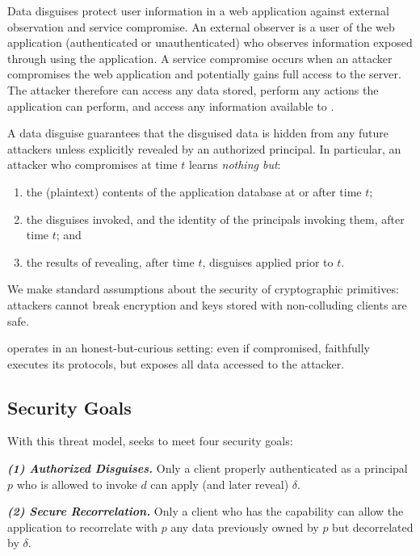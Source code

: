 %
Data disguises protect user information in a web application against external observation
and service compromise.
%
An external observer is a user of the web application (authenticated or unauthenticated) who
observes information exposed through using the application.
%
A service compromise occurs when an attacker compromises the web application and potentially
gains full access to the server.
%
The attacker therefore can access any data stored, perform any actions the application can
perform, and access any information available to \sys.
%

%
A data disguise guarantees that the disguised data is hidden from any future attackers unless
explicitly revealed by an authorized principal.
%
In particular, an attacker who compromises \sys at time $t$ learns \emph{nothing but}:
\begin{enumerate}[nosep]
  \item the (plaintext) contents of the application database at or after time $t$;
  \item the disguises invoked, and the identity of the principals invoking them, after time $t$; and
  \item the results of revealing, after time $t$, disguises applied prior to $t$.
\end{enumerate}
%
We make standard assumptions about the security of cryptographic primitives: attackers cannot
break encryption and keys stored with non-colluding clients are safe.
%

%
\sys operates in an honest-but-curious setting: even if compromised, \sys faithfully executes
its protocols, but exposes all data accessed to the attacker.
%

\subsection{Security Goals}
%
With this threat model, \sys seeks to meet four security goals:
%

%
\vspace{6pt}\noindent\textbf{\emph{(1) Authorized Disguises.}}
%
Only a client properly authenticated as a principal $p$ who is allowed to invoke $d$ can apply (and
later reveal) $\delta$.
%

%
\vspace{6pt}\noindent\textbf{\emph{(2) Secure Recorrelation.}}
%
Only a client who has the capability  can allow the application to recorrelate with $p$
any data previously owned by $p$ but decorrelated by $\delta$.
%

